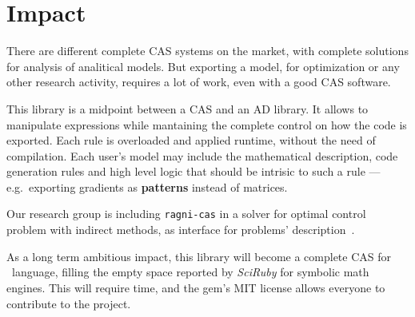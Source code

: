 
\section{Impact}
\label{sec:impact}

There are different complete CAS systems on the market, with complete solutions for analysis of analitical models. But exporting a model, for optimization or any other research activity, requires a lot of work, even with a good CAS software.

This library is a midpoint between a CAS and an AD library. It allows to manipulate expressions while mantaining the complete control on how the code is exported. Each rule is overloaded and applied runtime, without the need of compilation. Each user's model may include the mathematical description, code generation rules and high level logic that should be intrisic to such a rule --- e.g.~exporting gradients as \textbf{patterns} instead of matrices.

Our research group is including \texttt{ragni-cas} in a solver for optimal control problem with indirect methods, as interface for problems' description~\cite{biral2016notes}.

As a long term ambitious impact, this library will become a complete CAS for \Ruby~language, filling the empty space reported by \emph{SciRuby} for symbolic math engines. This will require time, and the gem's MIT license allows everyone to contribute to the project.
